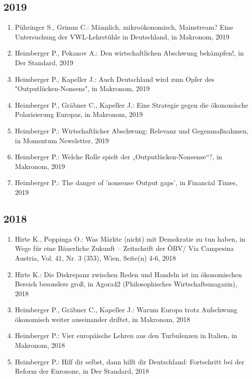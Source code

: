 \subsection*{2019}
\begin{enumerate}
    	 \item Pühringer S., Grimm C.: Männlich, mikroökonomisch, Mainstream? Eine Untersuchung der VWL-Lehrstühle in Deutschland, in Makronom, 2019
	 \item Heimberger P., Pekanov A.: Den wirtschaftlichen Abschwung bekämpfen!, in Der Standard, 2019
	 \item Heimberger P., Kapeller J.: Auch Deutschland wird zum Opfer des "Outputlücken-Nonsens", in Makronom, 2019
	 \item Heimberger P., Gräbner C., Kapeller J.: Eine Strategie gegen die ökonomische Polarisierung Europas, in Makronom, 2019
	 \item Heimberger P.: Wirtschaftlicher Abschwung: Relevanz und Gegenmaßnahmen, in Momentum Newsletter, 2019
	 \item Heimberger P.: Welche Rolle spielt der „Outputlücken-Nonsense“?, in Makronom, 2019
	 \item Heimberger P.: The danger of  'nonsense Output gaps', in Financial Times, 2019
\end{enumerate}
\subsection*{2018}
\begin{enumerate}
    	 \item Hirte K., Poppinga O.: Was Märkte (nicht) mit Demokratie zu tun haben, in Wege für eine Bäuerliche Zukunft – Zeitschrift der ÖBV/ Via Campesina Austria, Vol. 41, Nr. 3 (353), Wien, Seite(n) 4-6, 2018
	 \item Hirte K.: Die Diskrepanz zwischen Reden und Handeln ist im ökonomischen Bereich besonders groß, in Agora42 (Philosophisches Wirtschaftsmagazin), 2018
	 \item Heimberger P., Gräbner C., Kapeller J.: Warum Europa trotz Aufschwung ökonomisch weiter auseinander driftet, in Makronom, 2018
	 \item Heimberger P.: Vier europäische Lehren aus den Turbulenzen in Italien, in Makronom, 2018
	 \item Heimberger P.: Hilf dir selbst, dann hilft dir Deutschland: Fortschritt bei der Reform der Eurozone, in Der Standard, 2018
\end{enumerate}
